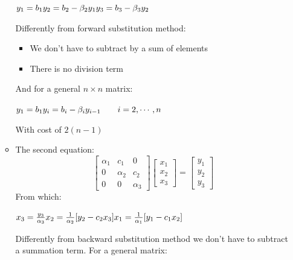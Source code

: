 \begin{itemize}
\begin{itemize}
            $
            y_1=b_1\\
            y_2=b_2-\beta_2y_1\\
            y_3=b_3-\beta_3y_2
            $

            \vspace{1em}
            Differently from forward substitution method:
            \begin{itemize}
                \item We don't have to subtract by a sum of elements
                \item There is no division term
            \end{itemize}
            And for a general $n\times n$ matrix:
            
            \begin{LARGE}
                $
                y_1=b_1\\
                y_i=b_i-\beta_iy_{i-1}\qquad i=2,\cdots,n
                $
            \end{LARGE}

            \vspace{1em}
            With cost of $2(n-1)$
            \item The second equation:
            $$
            \begin{bmatrix}
                \alpha_1 & c_1 & 0\\
                0 & \alpha_2 & c_2\\
                0 & 0 & \alpha_3
            \end{bmatrix}
            \begin{bmatrix}
                x_1\\
                x_2\\
                x_3
            \end{bmatrix}=
            \begin{bmatrix}
                y_1\\
                y_2\\
                y_3
            \end{bmatrix}
            $$
            From which:

            $
            x_3=\frac{y_3}{\alpha_3}\\
            x_2=\frac{1}{\alpha_2}[y_2-c_2x_3]\\
            x_1=\frac{1}{\alpha_1}[y_1-c_1x_2]
            $

            \vspace{1em}
            Differently from backward substitution method we don't have to subtract a summation term. For a general matrix:


\end{itemize}
\end{itemize}

